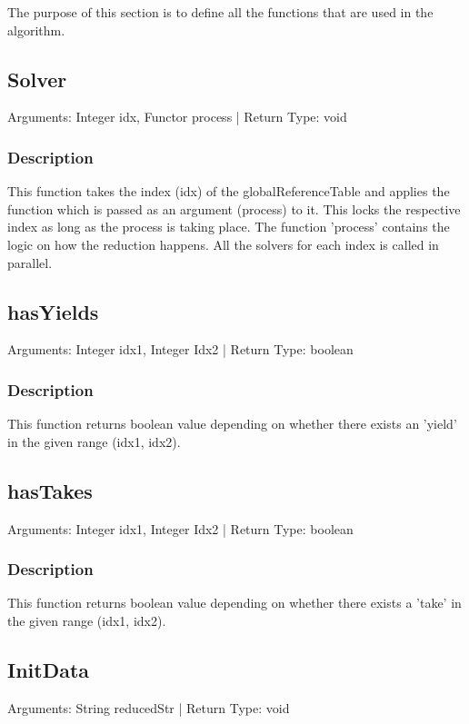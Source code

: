 \documentclass{article}
\begin{document}
\begin{flushleft}
The purpose of this section is to define all the functions that are used in the algorithm.

\subsection{Solver}

Arguments: Integer idx, Functor process | Return Type: void

\subsubsection*{Description}
This function takes the index (idx) of the globalReferenceTable and applies the function which is passed as an argument (process) to it. This locks the respective index as long as the process is taking place. The function 'process' contains the logic on how the reduction happens. All the solvers for each index is called in parallel.


\subsection{hasYields}

Arguments: Integer idx1, Integer Idx2 | Return Type: boolean

\subsubsection*{Description}
This function returns boolean value depending on whether there exists an 'yield' in the given range (idx1, idx2).


\subsection{hasTakes}

Arguments: Integer idx1, Integer Idx2 | Return Type: boolean

\subsubsection*{Description}
This function returns boolean value depending on whether there exists a 'take' in the given range (idx1, idx2).


\subsection{InitData}

Arguments: String reducedStr | Return Type: void


\end{flushleft}
\end{document}
